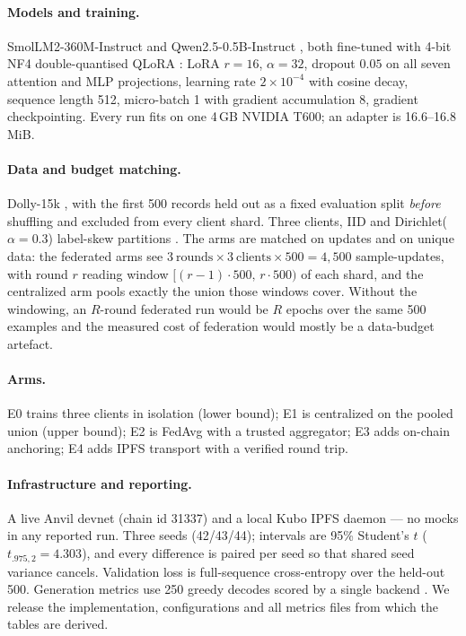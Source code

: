 \documentclass[11pt]{article}
\begin{document}
\paragraph{Models and training.} SmolLM2-360M-Instruct \cite{allal2025smollm2} and Qwen2.5-0.5B-Instruct \cite{qwen2024qwen25}, both fine-tuned with 4-bit NF4 double-quantised QLoRA \cite{dettmers2023qlora}: LoRA $r{=}16$, $\alpha{=}32$, dropout $0.05$ on all seven attention and MLP projections, learning rate $2{\times}10^{-4}$ with cosine decay, sequence length 512, micro-batch 1 with gradient accumulation 8, gradient checkpointing. Every run fits on one 4\,GB NVIDIA T600; an adapter is 16.6--16.8\,MiB.

\paragraph{Data and budget matching.} Dolly-15k \cite{conover2023dolly}, with the first 500 records held out as a fixed evaluation split \emph{before} shuffling and excluded from every client shard. Three clients, IID and Dirichlet($\alpha{=}0.3$) label-skew partitions \cite{hsu2019measuring}. The arms are matched on updates and on unique data: the federated arms see $3\ \text{rounds} \times 3\ \text{clients} \times 500 = 4{,}500$ sample-updates, with round $r$ reading window $[(r{-}1)\cdot 500,\, r\cdot 500)$ of each shard, and the centralized arm pools exactly the union those windows cover. Without the windowing, an $R$-round federated run would be $R$ epochs over the same 500 examples and the measured cost of federation would mostly be a data-budget artefact.

\paragraph{Arms.} E0 trains three clients in isolation (lower bound); E1 is centralized on the pooled union (upper bound); E2 is FedAvg with a trusted aggregator; E3 adds on-chain anchoring; E4 adds IPFS transport with a verified round trip.

\paragraph{Infrastructure and reporting.} A live Anvil devnet (chain id 31337) and a local Kubo IPFS daemon --- no mocks in any reported run. Three seeds (42/43/44); intervals are 95\% Student's $t$ ($t_{.975,2}{=}4.303$), and every difference is paired per seed so that shared seed variance cancels. Validation loss is full-sequence cross-entropy over the held-out 500. Generation metrics use 250 greedy decodes scored by a single backend \cite{lin-2004-rouge,papineni-etal-2002-bleu}. We release the implementation, configurations and all metrics files from which the tables are derived.
\end{document}
